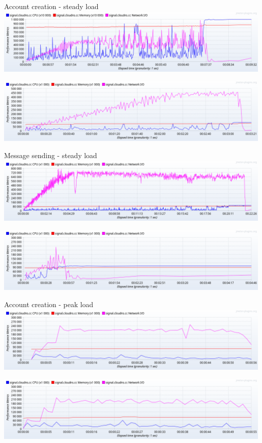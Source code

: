 \documentclass{beamer}
\begin{document}
\begin{frame}{Account creation - steady load}
    \centering
    \includegraphics[width=\textwidth]{img/4.97-steady-create}

    \vfill

    \centering
    \includegraphics[width=\textwidth]{img/6.13-steady-create}
\end{frame}

\begin{frame}{Message sending - steady load}
    \centering
    \includegraphics[width=\textwidth]{img/4.97-steady-message}

    \vfill

    \centering
    \includegraphics[width=\textwidth]{img/6.13-steady-message}
\end{frame}

\begin{frame}{Account creation - peak load}
    \centering
    \includegraphics[width=\textwidth]{img/4.97-peak-create}

    \vfill

    \centering
    \includegraphics[width=\textwidth]{img/6.13-peak-create}
\end{frame}
\end{document}
